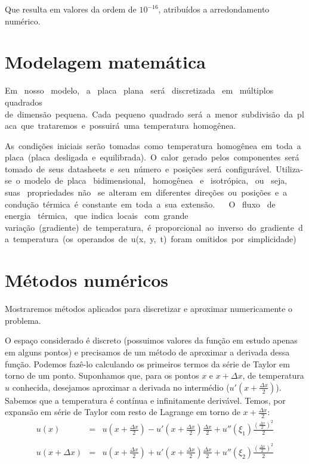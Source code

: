 \documentclass[12pt,fleqn]{article}
\begin{document}


Que resulta em valores da ordem de $10^{-16}$, atribuídos a arredondamento numérico.

\section{Modelagem matemática}
Em  nosso  modelo,  a  placa  plana  será  discretizada  em  múltiplos  quadrados  de dimensão pequena. Cada pequeno quadrado será a menor subdivisão da placa que trataremos e possuirá uma temperatura homogênea.

As condições iniciais serão tomadas como temperatura homogênea em toda a placa (placa desligada e equilibrada). O calor gerado pelos componentes será tomado de seus datasheets e seu número e posições será configurável. Utiliza­se o modelo de placa  bidimensional,  homogênea  e  isotrópica,  ou  seja,  suas  propriedades não  se alteram em diferentes direções ou posições e a  condução térmica é constante em toda a sua extensão. 
 
O  fluxo  de  energia  térmica,  que indica locais  com grande  variação (gradiente) de temperatura, é proporcional ao inverso do gradiente da temperatura (os operandos de u(x, y, t) foram omitidos por simplicidade)

\section{Métodos numéricos}
Mostraremos métodos aplicados para discretizar e aproximar numericamente o problema.

O espaço considerado é discreto (possuimos valores da função em estudo apenas em alguns pontos) e precisamos de um método de aproximar a derivada dessa função. Podemos fazê-lo calculando os primeiros termos da série de Taylor em torno de um ponto. Suponhamos que, para os pontos $x$ e $x + \Delta x$, de temperatura $u$ conhecida, desejamos aproximar a derivada no intermédio ($u'(x + \frac{\Delta x}{2})$). Sabemos que a temperatura é contínua e infinitamente derivável. Temos, por expansão em série de Taylor com resto de Lagrange em torno de $x + \frac{\Delta x}{2}$:
\begin{equation}
\label{expansao_taylor_derivada}
\begin{array}{rcl}
	u(x) & = & u(x + \frac{\Delta x}{2}) - u'(x + \frac{\Delta x}{2}) \frac{\Delta x}{2} + u''(\xi_1) \frac{(\frac{\Delta x}{2}) ^ 2}{2} \\ \\
	u(x + \Delta x) & = & u(x + \frac{\Delta x}{2}) + u'(x + \frac{\Delta x}{2}) \frac{\Delta x}{2} + u''(\xi_2) \frac{(\frac{\Delta x}{2}) ^ 2}{2}
\end{array}
\end{equation}
\end{document}
